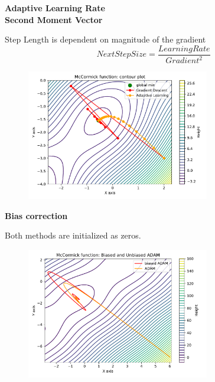\documentclass{beamer}
\newcommand\myheading[1]{%
  \par\bigskip
  {\Large\bfseries#1}\par\smallskip}
\begin{document}
\begin{frame}
    \myheading{Adaptive Learning Rate\\Second Moment Vector}
    Step Length is dependent on magnitude of the gradient
    $$NextStepSize = \frac{LearningRate}{Gradient^2} $$
    
    \begin{figure}[h]
        \includegraphics[width=8cm]{report/figures/GD_rmsprop.pdf}
    \end{figure}
\end{frame}


\begin{frame}
    \myheading{Bias correction}
    Both methods are initialized as zeros.
    
    \begin{figure}[h]
        \includegraphics[width=8cm]{report/figures/ADAM_bias.pdf}
    \end{figure}
\end{frame}
\end{document}

